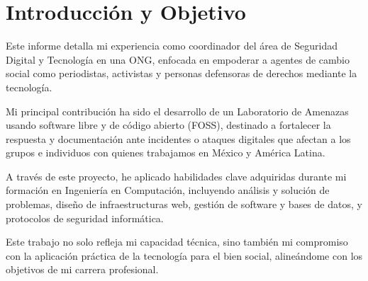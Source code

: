 \documentclass[12pt]{caltech_thesis}
\begin{document}

\chapter{Introducción y Objetivo}


Este informe detalla mi experiencia como coordinador del área de Seguridad Digital y Tecnología en una ONG, enfocada en empoderar a agentes de cambio social como periodistas, activistas y personas defensoras de derechos mediante la tecnología.

Mi principal contribución ha sido el desarrollo de un Laboratorio de Amenazas usando software libre y de código abierto (FOSS), destinado a fortalecer la respuesta y documentación ante incidentes o ataques digitales que afectan a los grupos e individuos con quienes trabajamos en México y América Latina.

A través de este proyecto, he aplicado habilidades clave adquiridas durante mi formación en Ingeniería en Computación, incluyendo análisis y solución de problemas, diseño de infraestructuras web, gestión de software y bases de datos, y protocolos de seguridad informática.

Este trabajo no solo refleja mi capacidad técnica, sino también mi compromiso con la aplicación práctica de la tecnología para el bien social, alineándome con los objetivos de mi carrera profesional.
\end{document}
